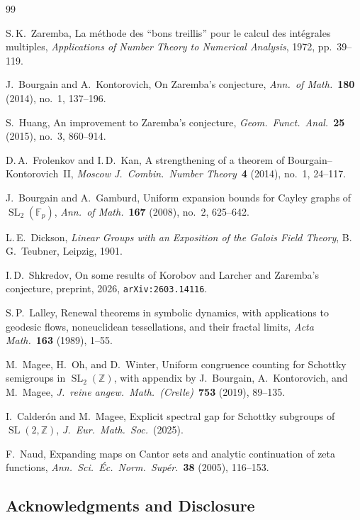 \documentclass[11pt,a4paper]{amsart}
\theoremstyle{definition}
\DeclareMathOperator{\SL}{SL}
\begin{document}
\begin{thebibliography}{99}

S.\,K.~Zaremba, La m\'ethode des ``bons treillis'' pour le calcul des int\'egrales multiples, \emph{Applications of Number Theory to Numerical Analysis}, 1972, pp.~39--119.

J.~Bourgain and A.~Kontorovich, On Zaremba's conjecture, \emph{Ann.\ of Math.}~\textbf{180} (2014), no.~1, 137--196.

S.~Huang, An improvement to Zaremba's conjecture, \emph{Geom.\ Funct.\ Anal.}~\textbf{25} (2015), no.~3, 860--914.

D.\,A.~Frolenkov and I.\,D.~Kan, A strengthening of a theorem of Bourgain--Kontorovich~II, \emph{Moscow J.\ Combin.\ Number Theory}~\textbf{4} (2014), no.~1, 24--117.

J.~Bourgain and A.~Gamburd, Uniform expansion bounds for Cayley graphs of $\SL_2(\mathbb{F}_p)$, \emph{Ann.\ of Math.}~\textbf{167} (2008), no.~2, 625--642.

L.\,E.~Dickson, \emph{Linear Groups with an Exposition of the Galois Field Theory}, B.\,G.~Teubner, Leipzig, 1901.

I.\,D.~Shkredov, On some results of Korobov and Larcher and Zaremba's conjecture, preprint, 2026, \texttt{arXiv:2603.14116}.

S.\,P.~Lalley, Renewal theorems in symbolic dynamics, with applications to geodesic flows, noneuclidean tessellations, and their fractal limits, \emph{Acta Math.}~\textbf{163} (1989), 1--55.


M.~Magee, H.~Oh, and D.~Winter, Uniform congruence counting for Schottky semigroups in $\SL_2(\mathbb{Z})$, with appendix by J.~Bourgain, A.~Kontorovich, and M.~Magee, \emph{J.\ reine angew.\ Math.\ (Crelle)}~\textbf{753} (2019), 89--135.

I.~Calder\'on and M.~Magee, Explicit spectral gap for Schottky subgroups of $\SL(2, \mathbb{Z})$, \emph{J.\ Eur.\ Math.\ Soc.}~(2025).

F.~Naud, Expanding maps on Cantor sets and analytic continuation of zeta functions, \emph{Ann.\ Sci.\ \'Ec.\ Norm.\ Sup\'er.}~\textbf{38} (2005), 116--153.

\end{thebibliography}

\subsection*{Acknowledgments and Disclosure}
\end{document}
